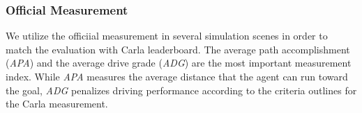 \documentclass[preprint,12pt]{elsarticle}
\begin{document}
\begin{table}
	\caption{Town05 outcomes based on offline measurements.
		Carla is used to evaluate all methods.
		3 experiment with various random seeds are used to calculate the mean values and standard deviations.
		Better performance is indicated by higher values for metrics marked with $\uparrow$, while lower are perferred for those marked with $\downarrow$.}
	\centering
	\label{tab:T5_results}
\end{table}

\subsubsection{Official Measurement}\label{lb_metrics}
\hspace{1pc}We utilize the officiial measurement in several simulation scenes in order to match the evaluation with Carla leaderboard\cite{Hu:2022}.
The average path accomplishment (\emph{APA}) and the average drive grade (\emph{ADG}) are the most important measurement index. 
While \emph{APA} measures the average distance that the agent can run toward the goal,
\emph{ADG} penalizes driving performance according to the criteria outlines for the Carla measurement.
\end{document}
